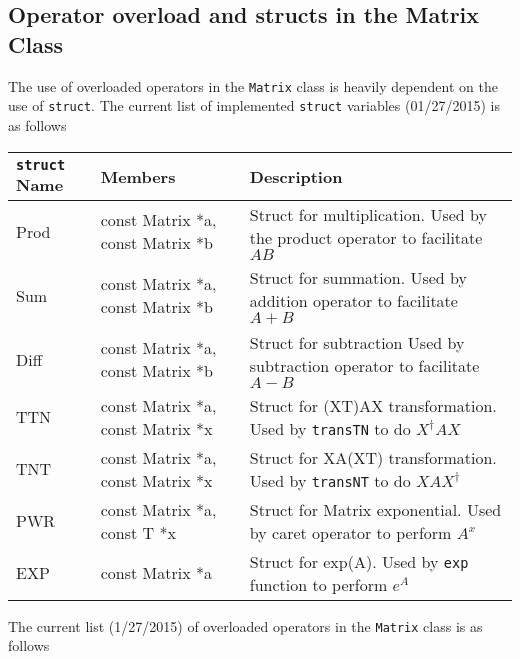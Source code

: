 \documentclass[english,journal=jctcce,manuscript=article,etalmode=truncate,maxauthors=0]{article}
\begin{document}
\subsection{Operator overload and structs in the Matrix Class}
The use of overloaded operators in the \texttt{Matrix} class is heavily dependent on the use of \texttt{struct}. The current list of implemented \texttt{struct} variables (01/27/2015) is as follows
\begin{table}[h!]
\begin{tabular}{| l | l | l |}
\hline
\texttt{struct} \textbf{Name} & \textbf{Members} & \textbf{Description}\\
\hline
Prod& const Matrix *a, const Matrix *b& Struct for multiplication. Used by the product operator to facilitate $AB$\\
 Sum& const Matrix *a, const Matrix *b& Struct for summation. Used by addition operator to facilitate $A+B$\\
Diff& const Matrix *a, const Matrix *b& Struct for subtraction Used by subtraction operator to facilitate $A-B$\\
 TTN& const Matrix *a, const Matrix *x& Struct for (XT)AX transformation. Used by \texttt{transTN} to do $X^\dagger A X$\\
 TNT& const Matrix *a, const Matrix *x& Struct for XA(XT) transformation. Used by \texttt{transNT} to do $X A X^\dagger$\\
 PWR& const Matrix *a, const T      *x& Struct for Matrix exponential. Used by caret operator to perform $A^x$\\
 EXP& const Matrix *a                 & Struct for exp(A). Used by \texttt{exp} function to perform $e^A$\\
\hline
\end{tabular}
\end{table}
\newpage
The current list (1/27/2015) of overloaded operators in the \texttt{Matrix} class is as follows
\end{document}
